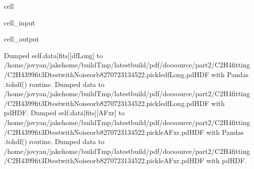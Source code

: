 \documentclass[letterpaper,table,10pt,english]{jupyterBook}
\begin{document}
\begin{sphinxuseclass}{cell}\begin{sphinxVerbatimInput}

\begin{sphinxuseclass}{cell_input}
\begin{sphinxVerbatim}[commandchars=\\\{\}]

      
\end{sphinxVerbatim}

\end{sphinxuseclass}\end{sphinxVerbatimInput}
\begin{sphinxVerbatimOutput}

\begin{sphinxuseclass}{cell_output}
\begin{sphinxVerbatim}[commandchars=\\\{\}]
Dumped self.data[fits][dfLong] to /home/jovyan/jake\PYGZhy{}home/buildTmp/\PYGZus{}latest\PYGZus{}build/pdf/doc\PYGZhy{}source/part2/C2H4fitting/C2H4\PYGZus{}399\PYGZus{}fit\PYGZus{}3D\PYGZhy{}test\PYGZus{}withNoise\PYGZus{}orb8\PYGZus{}270723\PYGZus{}13\PYGZhy{}45\PYGZhy{}22.pickle\PYGZus{}dfLong.pdHDF with Pandas .to\PYGZus{}hdf() routine.
Dumped data to /home/jovyan/jake\PYGZhy{}home/buildTmp/\PYGZus{}latest\PYGZus{}build/pdf/doc\PYGZhy{}source/part2/C2H4fitting/C2H4\PYGZus{}399\PYGZus{}fit\PYGZus{}3D\PYGZhy{}test\PYGZus{}withNoise\PYGZus{}orb8\PYGZus{}270723\PYGZus{}13\PYGZhy{}45\PYGZhy{}22.pickle\PYGZus{}dfLong.pdHDF with pdHDF.
Dumped self.data[fits][AFxr] to /home/jovyan/jake\PYGZhy{}home/buildTmp/\PYGZus{}latest\PYGZus{}build/pdf/doc\PYGZhy{}source/part2/C2H4fitting/C2H4\PYGZus{}399\PYGZus{}fit\PYGZus{}3D\PYGZhy{}test\PYGZus{}withNoise\PYGZus{}orb8\PYGZus{}270723\PYGZus{}13\PYGZhy{}45\PYGZhy{}22.pickle\PYGZus{}AFxr.pdHDF with Pandas .to\PYGZus{}hdf() routine.
Dumped data to /home/jovyan/jake\PYGZhy{}home/buildTmp/\PYGZus{}latest\PYGZus{}build/pdf/doc\PYGZhy{}source/part2/C2H4fitting/C2H4\PYGZus{}399\PYGZus{}fit\PYGZus{}3D\PYGZhy{}test\PYGZus{}withNoise\PYGZus{}orb8\PYGZus{}270723\PYGZus{}13\PYGZhy{}45\PYGZhy{}22.pickle\PYGZus{}AFxr.pdHDF with pdHDF.
\end{sphinxVerbatim}

\end{sphinxuseclass}\end{sphinxVerbatimOutput}

\end{sphinxuseclass}
\end{document}
